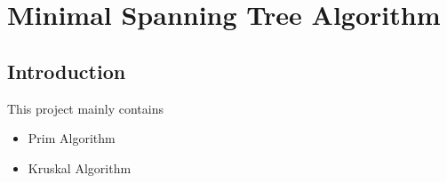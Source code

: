 \documentclass[cs4size, punct, nospace, fancyhdr, fntef]{ctexart}
\begin{document}
  \section{Minimal Spanning Tree Algorithm}

  \subsection{Introduction}
    This project mainly contains
    \begin{itemize}
      \item Prim Algorithm
      \item Kruskal Algorithm
    \end{itemize}
\end{document}
